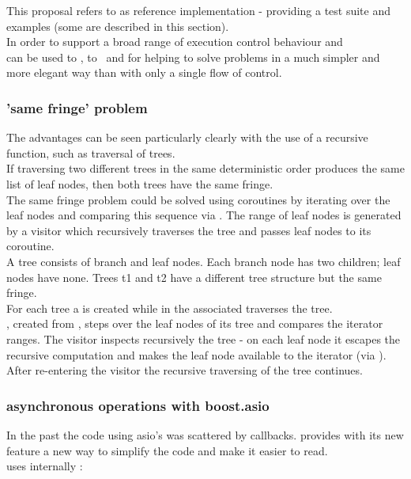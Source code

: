 
This proposal refers to \boostcoroutine as reference implementation - providing
a test suite and examples (some are described in this section).\\
\newline
In order to support a broad range of execution control behaviour \pushcoro and\\
\pullcoro can be used to \escrecloops, to \escreccomps~and for \coopmultitasking
helping to solve problems in a much simpler and more elegant way than with only
a single flow of control.

\subsubsection*{'same fringe' problem}
The advantages can be seen particularly clearly with the use of a recursive
function, such as traversal of trees.\\
If traversing two different trees in the same deterministic order produces the
same list of leaf nodes, then both trees have the same fringe.\\
\newline
The same fringe problem could be solved using coroutines by iterating over the
leaf nodes and comparing this sequence via . The range of leaf
nodes is generated by a visitor which recursively traverses the tree and passes
leaf nodes to its coroutine.\\
A tree consists of branch and leaf nodes. Each branch node has two children;
leaf nodes have none. Trees t1 and t2 have a different tree structure but the
same fringe.\\
For each tree a \pullcoro is created while in the associated \corofunction
{} traverses the tree.\\
\pullcoroiterator, created from \pullcoro, steps over the leaf nodes of its tree
and  compares the iterator ranges.
\newline
\newline
The visitor inspects recursively the tree - on each leaf node it escapes the
recursive computation and makes the leaf node available to the iterator (via
\pushcoro). After re-entering the visitor the recursive traversing of the tree
continues.

\subsubsection*{asynchronous operations with boost.asio}
In the past the code using asio's \asyncops was scattered by callbacks.
\boostasio provides with its new \asyncres feature a new way to simplify the
code and make it easier to read.\\
\yieldcontext uses internally \boostcoroutine:

